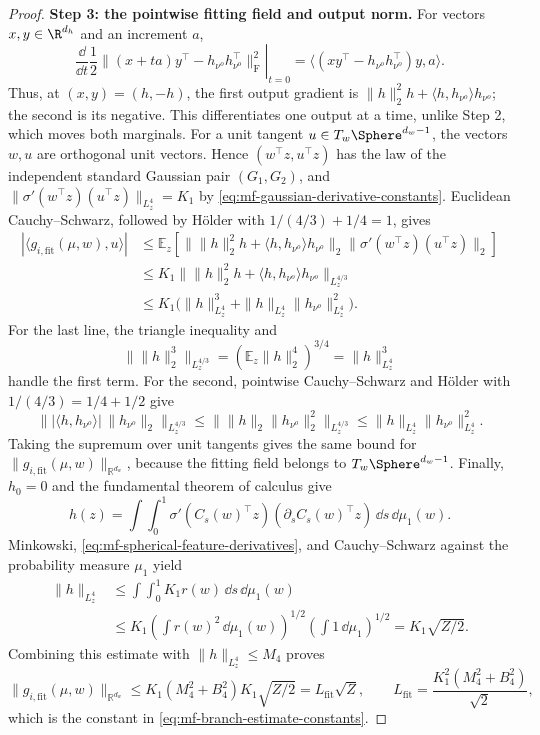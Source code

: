 \begin{proof}
\par\noindent\textbf{Step 3: the pointwise fitting field and output norm.}
For vectors \(x,y\in\R^{d_h}\) and an increment \(a\),
\[
 \left.\frac{\dd}{\dd t}\frac12
 \|(x+ta)y^\top-h_{\nu^o}h_{\nu^o}^\top\|_{\mathrm F}^2\right|_{t=0}
 =\langle (xy^\top-h_{\nu^o}h_{\nu^o}^\top)y,a\rangle.
\]
Thus, at \((x,y)=(h,-h)\), the first output gradient is
\(\|h\|_2^2h+\langle h,h_{\nu^o}\rangle h_{\nu^o}\); the second is
its negative. This differentiates one output at a time, unlike Step 2,
which moves both marginals.
For a unit tangent \(u\in T_w\Sphere^{d_w-1}\), the vectors \(w,u\) are
orthogonal unit vectors.  Hence \((w^\top z,u^\top z)\) has the law of the
independent standard Gaussian pair \((G_1,G_2)\), and
\(\|\sigma'(w^\top z)(u^\top z)\|_{L^4_z}=K_1\) by
\cref{eq:mf-gaussian-derivative-constants}.  Euclidean Cauchy--Schwarz,
followed by H\"older with \(1/(4/3)+1/4=1\), gives
\[
\begin{aligned}
 |\langle g_{i,\mathrm{fit}}(\mu,w),u\rangle|
 &\le\mathbb E_z\!\left[
 \bigl\|\|h\|_2^2h+\langle h,h_{\nu^o}\rangle h_{\nu^o}\bigr\|_2
 \bigl\|\sigma'(w^\top z)(u^\top z)\bigr\|_2\right]\\
 &\le K_1\bigl\|\|h\|_2^2h
              +\langle h,h_{\nu^o}\rangle h_{\nu^o}\bigr\|_{L^{4/3}_z}\\
 &\le K_1\bigl(\|h\|_{L^4_z}^3
                     +\|h\|_{L^4_z}\|h_{\nu^o}\|_{L^4_z}^2\bigr).
\end{aligned}
\]
For the last line, the triangle inequality and
\[
 \|\|h\|_2^3\|_{L^{4/3}_z}
 =(\mathbb E_z\|h\|_2^4)^{3/4}=\|h\|_{L^4_z}^3
\]
handle the first term.  For the second, pointwise Cauchy--Schwarz and
H\"older with \(1/(4/3)=1/4+1/2\) give
\[
 \bigl\||\langle h,h_{\nu^o}\rangle|\,\|h_{\nu^o}\|_2
 \bigr\|_{L^{4/3}_z}
 \le\|\|h\|_2\|h_{\nu^o}\|_2^2\|_{L^{4/3}_z}
 \le\|h\|_{L^4_z}\|h_{\nu^o}\|_{L^4_z}^2.
\]
Taking the supremum over unit tangents gives the same bound for
\(\|g_{i,\mathrm{fit}}(\mu,w)\|_{\mathbb R^{d_w}}\), because the fitting
field belongs to \(T_w\Sphere^{d_w-1}\).
Finally, \(h_0=0\) and the fundamental theorem of calculus give
\[
 h(z)=\int\int_0^1\sigma'(C_s(w)^\top z)
                      (\partial_sC_s(w)^\top z)\,\dd s\,\dd\mu_1(w).
\]
Minkowski, \cref{eq:mf-spherical-feature-derivatives}, and
Cauchy--Schwarz against the probability measure \(\mu_1\) yield
\[
\begin{aligned}
 \|h\|_{L^4_z}
 &\le\int\int_0^1 K_1 r(w)\,\dd s\,\dd\mu_1(w)\\
 &\le K_1\left(\int r(w)^2\,\dd\mu_1(w)\right)^{1/2}
          \left(\int1\,\dd\mu_1\right)^{1/2}
 =K_1\sqrt{Z/2}.
\end{aligned}
\]
Combining this estimate with \(\|h\|_{L^4_z}\le M_4\) proves
\[
 \|g_{i,\mathrm{fit}}(\mu,w)\|_{\mathbb R^{d_w}}
 \le K_1(M_4^2+B_4^2)K_1\sqrt{Z/2}
 =L_{\mathrm{fit}}\sqrt Z,
 \qquad L_{\mathrm{fit}}=\frac{K_1^2(M_4^2+B_4^2)}{\sqrt2},
\]
which is the constant in \cref{eq:mf-branch-estimate-constants}.
\end{proof}

